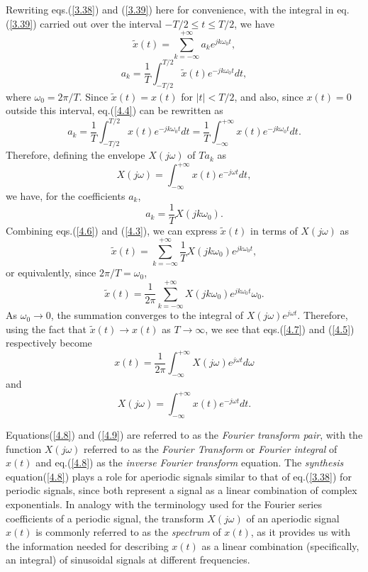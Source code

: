 \documentclass[a4paper,twoside]{book}
\begin{document}
Rewriting eqs.\;(\ref{3.38}) and (\ref{3.39}) here for convenience, with the integral in eq.\;(\ref{3.39}) carried out over the interval $-T/2\le t\le T/2$, we have
\begin{equation}
    \tilde{x}(t) = \sum_{k=-\infty}^{+\infty}a_ke^{jk\omega_0t},
    \label{4.3}
\end{equation}
\begin{equation}
    a_k = \frac{1}{T}\int_{-T/2}^{T/2}\tilde{x}(t)e^{-jk\omega_0t}dt,
    \label{4.4}
\end{equation}
where $\omega_0=2\pi/T$. Since $\tilde{x}(t)=x(t)$ for $|t|<T/2$, and also, since $x(t)=0$ outside this interval, eq.\;(\ref{4.4}) can be rewritten as $$a_k = \frac1T\int_{-T/2}^{T/2}x(t)e^{-jk\omega_0t}dt = \frac1T\int_{-\infty}^{+\infty}x(t)e^{-jk\omega_0t}dt.$$ Therefore, defining the envelope $X(j\omega)$ of $Ta_k$ as
\begin{equation}
    X(j\omega)=\int_{-\infty}^{+\infty}x(t)e^{-j\omega t}dt,
    \label{4.5}
\end{equation}
we have, for the coefficients $a_k$,
\begin{equation}
    a_k=\dfrac1TX(jk\omega_0).
    \label{4.6}
\end{equation}
Combining eqs.\;(\ref{4.6}) and (\ref{4.3}), we can express $\tilde{x}(t)$ in terms of $X(j\omega)$ as $$\tilde{x}(t) = \sum_{k = -\infty}^{+\infty}\frac{1}{T}X(jk\omega_0)e^{jk\omega_0t},$$ or equivalently, since $2\pi/T=\omega_0$,
\begin{equation}
    \tilde{x}(t)=\frac1{2\pi}\sum_{k=-\infty}^{+\infty}X(jk\omega_0)e^{jk\omega_0t}\omega_0.
    \label{4.7}
\end{equation}
As $\omega_0\to 0$, the summation converges to the integral of $X(j\omega)e^{j\omega t}$. Therefore, using the fact that $\tilde{x}(t)\to x(t)$ as $T\to\infty$, we see that eqs.\;(\ref{4.7}) and (\ref{4.5}) respectively become
\begin{equation}
    \boxed{x(t)=\frac1{2\pi}\int_{-\infty}^{+\infty}X(j\omega)e^{j\omega t}d\omega}
    \label{4.8}
\end{equation}
and
\begin{equation}
    \boxed{X(j\omega)=\int_{-\infty}^{+\infty}x(t)e^{-j\omega t}dt.}
    \label{4.9}
\end{equation}

Equations\;(\ref{4.8}) and (\ref{4.9}) are referred to as the \textit{Fourier transform pair}, with the function $X(j\omega)$ referred to as the \textit{Fourier Transform} or \textit{Fourier integral} of $x(t)$ and eq.\;(\ref{4.8}) as the \textit{inverse Fourier transform} equation. The \textit{synthesis} equation\;(\ref{4.8}) plays a role for aperiodic signals similar to that of eq.\;(\ref{3.38}) for periodic signals, since both represent a signal as a linear combination of complex exponentials. In analogy with the terminology used for the Fourier series coefficients of a periodic signal, the transform $X(j\omega)$ of an aperiodic signal $x(t)$ is commonly referred to as the \textit{spectrum} of $x(t)$, as it provides us with the information needed for describing $x(t)$ as a linear combination (specifically, an integral) of sinusoidal signals at different frequencies.
\end{document}
